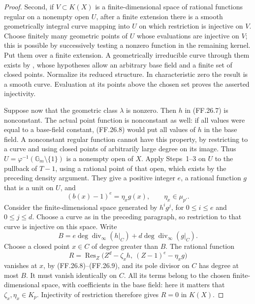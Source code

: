\begin{proof}
Second, if \(V\subset K(X)\) is a finite-dimensional
space of rational functions regular on a nonempty open
\(U\), after a finite extension there is a smooth
geometrically integral curve mapping into \(U\) on
which restriction is injective on \(V\). Choose finitely
many geometric points of \(U\) whose evaluations are
injective on \(V\); this is possible by successively
testing a nonzero function in the remaining kernel.
Put them over a finite extension. A geometrically
irreducible curve through them exists by
\citet[Theorem~1.8, Corollary~1.9]{FF_CharlesPoonen2016},
whose hypotheses allow an arbitrary base field and
a finite set of closed points. Normalize its reduced
structure. In characteristic zero the result is a
smooth curve. Evaluation at its points above the
chosen set proves the asserted injectivity.

Suppose now that the geometric class \(\lambda\)
is nonzero. Then \(h\) in (FF.26.7) is nonconstant.
The actual point function is nonconstant as well:
if all values were equal to a base-field constant,
(FF.26.8) would put all values of \(h\) in the
base field. A nonconstant regular function cannot
have this property, by restricting to a curve and
using closed points of arbitrarily large degree
on its image.
Thus \(U=\varphi^{-1}(\mathbb G_m\setminus\{1\})\)
is a nonempty open of \(X\). Apply Steps~1--3 on
\(U\) to the pullback of \(T-1\), using a
rational point of that open, which exists by the preceding
density argument.
They give a positive integer \(e\), a rational
function \(g\) that is a unit on \(U\), and
\[
                     (b(x)-1)^e=\eta_xg(x),
                           \qquad\eta_x\in\mu_{p'}.
                                                               \tag{FF.26.9}
\]
Consider the finite-dimensional space generated by
\(h^ig^j\), for \(0\leq i\leq e\) and
\(0\leq j\leq d\). Choose a curve as in the preceding
paragraph, so restriction to that curve is injective
on this space. Write
\[
              B=e\deg\operatorname{div}_\infty(h|_C)
                   +d\deg\operatorname{div}_\infty(g|_C).
\]
Choose a closed point \(x\in C\) of degree greater
than \(B\). The rational function
\[
 R=\operatorname{Res}_Z
       \bigl(Z^d-\zeta_xh,\ (Z-1)^e-\eta_xg\bigr)
                                                               \tag{FF.26.10}
\]
vanishes at \(x\), by (FF.26.8)--(FF.26.9), and
its pole divisor on \(C\) has degree at most \(B\).
It must vanish identically on \(C\). All its terms
belong to the chosen finite-dimensional space, with
coefficients in the base field: here it matters that
\(\zeta_x,\eta_x\in K_p\). Injectivity of restriction
therefore gives \(R=0\) in \(K(X)\).


\end{proof}
